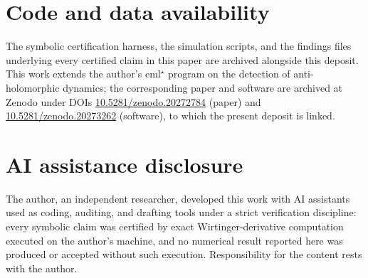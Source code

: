\documentclass[11pt,a4paper]{article}
\begin{document}
\section*{Code and data availability}

The symbolic certification harness, the simulation scripts, and the findings
files underlying every certified claim in this paper are archived alongside
this deposit. This work extends the author's eml$^\star$ program on the
detection of anti-holomorphic dynamics; the corresponding paper and software
are archived at Zenodo under DOIs \href{https://doi.org/10.5281/zenodo.20272784}{10.5281/zenodo.20272784}
(paper) and \href{https://doi.org/10.5281/zenodo.20273262}{10.5281/zenodo.20273262}
(software), to which the present deposit is linked.

\section*{AI assistance disclosure}

The author, an independent researcher, developed this work with AI assistants
used as coding, auditing, and drafting tools under a strict verification
discipline: every symbolic claim was certified by exact Wirtinger-derivative
computation executed on the author's machine, and no numerical result reported
here was produced or accepted without such execution. Responsibility for the
content rests with the author.
\end{document}
